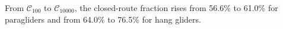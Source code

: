 From $\mathcal C_{100}$ to $\mathcal C_{10000}$, the closed-route fraction rises from 56.6\% to 61.0\% for paragliders and from 64.0\% to 76.5\% for hang gliders.
